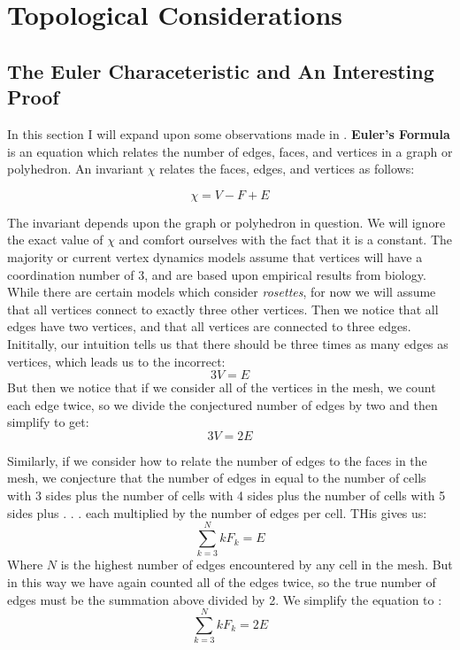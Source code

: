 \chapter{Topological Considerations}

\section{The Euler Characeteristic and An Interesting Proof}
In this section I will expand upon some observations made in \cite{Soap}. \textbf{Euler's Formula} is an equation which relates the number of edges, faces, and vertices in a graph or polyhedron. An invariant $\chi$ relates the faces, edges, and vertices as follows:

\begin{equation}
\chi = V - F + E
\end{equation}

The invariant depends upon the graph or polyhedron in question. We will ignore the exact value of $\chi$ and comfort ourselves with the fact that it is a constant. The majority or current vertex dynamics models assume that vertices will have a coordination number of 3, and are based upon empirical results from biology. While there are certain models which consider \emph{rosettes}, for now we will assume that all vertices connect to exactly three other vertices. Then we notice that all edges have two vertices, and that all vertices are connected to three edges. Inititally, our intuition tells us that there should be three times as many edges as vertices, which leads us to the incorrect:
\begin{equation}
3V = E
\end{equation}
But then we notice that if we consider all of the vertices in the mesh, we count each edge twice, so we divide the conjectured  number of edges by two and then simplify to get:
\begin{equation}
3V = 2E
\end{equation}

Similarly, if we consider how to relate the number of edges to the faces in the mesh, we conjecture that the number of edges in equal to the number of cells with 3 sides plus the number of cells with 4 sides plus the number of cells with 5 sides plus . . . each multiplied by the number of edges per cell. THis gives us:
\begin{equation}
\sum_{k=3}^N kF_k = E
\end{equation}
Where $N$ is the highest number of edges encountered by any cell in the mesh. But in this way we have again counted all of the edges twice, so the true number of edges must be the summation above divided by 2. We simplify the equation to :
\begin{equation}
\sum_{k=3}^N kF_k = 2E
\end{equation}

